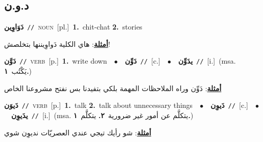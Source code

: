 \documentclass[10pt,a4paper,twoside]{article} %
\begin{document}
\begin{multicols}{2}
\vspace{-3mm}
\subsection*{\color{blue}\foreignlanguage{arabic}{د.و.ن}\color{blue}{}} 

{\setlength\topsep{0pt}\textbf{\foreignlanguage{arabic}{دَوَاوِين}}\ {\color{gray}\texttt{//}\color{black}}\ \textsc{noun}\ [pl.]\ \textbf{1.}~chit-chat  \textbf{2.}~stories\  \begin{flushright}\color{gray}\foreignlanguage{arabic}{\textbf{\underline{\foreignlanguage{arabic}{أمثلة}}}: هاي الكلية دَواوِيننها بتخلصش!}\end{flushright}\color{black}} \vspace{2mm}

{\setlength\topsep{0pt}\textbf{\foreignlanguage{arabic}{دَوَّن}}\ {\color{gray}\texttt{//}\color{black}}\ \textsc{verb}\ [p.]\ \textbf{1.}~write down\ \ $\bullet$\ \ \setlength\topsep{0pt}\textbf{\foreignlanguage{arabic}{دَوِّن}}\ {\color{gray}\texttt{//}\color{black}}\ [c.]\ \ $\bullet$\ \ \setlength\topsep{0pt}\textbf{\foreignlanguage{arabic}{يدَوِّن}}\ {\color{gray}\texttt{//}\color{black}}\ [i.]\ \color{gray}(msa. \foreignlanguage{arabic}{يَكْتُب}~\foreignlanguage{arabic}{\textbf{١.}})\color{black}\  \begin{flushright}\color{gray}\foreignlanguage{arabic}{\textbf{\underline{\foreignlanguage{arabic}{أمثلة}}}: دَوِّن وراه الملاحظات المهمة بلكي بتفيدنا بس نفتح مشروعنا الخاص}\end{flushright}\color{black}} \vspace{2mm}

{\setlength\topsep{0pt}\textbf{\foreignlanguage{arabic}{دَيوَن}}\ {\color{gray}\texttt{//}\color{black}}\ \textsc{verb}\ [p.]\ \textbf{1.}~talk  \textbf{2.}~talk about unnecessary things\ \ $\bullet$\ \ \setlength\topsep{0pt}\textbf{\foreignlanguage{arabic}{دَيوِن}}\ {\color{gray}\texttt{//}\color{black}}\ [c.]\ \ $\bullet$\ \ \setlength\topsep{0pt}\textbf{\foreignlanguage{arabic}{يدَيوِن}}\ {\color{gray}\texttt{//}\color{black}}\ [i.]\ \color{gray}(msa. \foreignlanguage{arabic}{يتكلَّم عن أمور غير ضرورية}~\foreignlanguage{arabic}{\textbf{٢.}}  \foreignlanguage{arabic}{يتكلَّم}~\foreignlanguage{arabic}{\textbf{١.}})\color{black}\  \begin{flushright}\color{gray}\foreignlanguage{arabic}{\textbf{\underline{\foreignlanguage{arabic}{أمثلة}}}: شو رأيك تيجي عندي العصريّات نديوِن شوي}\end{flushright}\color{black}} \vspace{2mm}


\end{multicols}
\end{document}
